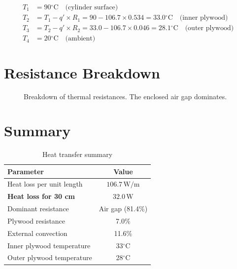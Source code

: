 \documentclass[11pt]{article}
\newcommand{\degC}{$^\circ$C}
\newcommand{\unit}[1]{\,\mathrm{#1}}
\begin{document}
\begin{align}
    T_1 &= 90\text{\degC} \quad \text{(cylinder surface)} \\
    T_2 &= T_1 - q' \times R_1 = 90 - 106.7 \times 0.534 = \boxed{33.0\text{\degC}} \quad \text{(inner plywood)} \\
    T_3 &= T_2 - q' \times R_2 = 33.0 - 106.7 \times 0.046 = \boxed{28.1\text{\degC}} \quad \text{(outer plywood)} \\
    T_4 &= 20\text{\degC} \quad \text{(ambient)}
\end{align}

\section{Resistance Breakdown}

\begin{figure}[h]
\centering
{}
\caption{Breakdown of thermal resistances. The enclosed air gap dominates.}
\label{fig:resistance_bar}
\end{figure}

\section{Summary}

\begin{table}[h]
\centering
\caption{Heat transfer summary}
\begin{tabular}{lc}
\toprule
\textbf{Parameter} & \textbf{Value} \\
\midrule
Heat loss per unit length & $106.7\unit{W/m}$ \\
\textbf{Heat loss for 30 cm} & $\mathbf{32.0\unit{W}}$ \\
\midrule
Dominant resistance & Air gap (81.4\%) \\
Plywood resistance & 7.0\% \\
External convection & 11.6\% \\
\midrule
Inner plywood temperature & 33\degC \\
Outer plywood temperature & 28\degC \\
\bottomrule
\end{tabular}
\end{table}
\end{document}
